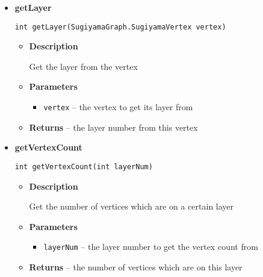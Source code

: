 {{{{{{{{{{{\begin{itemize}
{\begin{itemize}
{Assigns a vertex to a certain layer represented by a number.
}
\item{
{\bf  Parameters}
  \begin{itemize}
   \item{
\texttt{vertex} -- the vertex to assign to a layer}
   \item{
\texttt{layerNum} -- the layer number to assign a vertex to}
  \end{itemize}
}%
\end{itemize}
}%
\item{ 
{\bf  getLayer}\\
\begin{lstlisting}[frame=none]
int getLayer(SugiyamaGraph.SugiyamaVertex vertex)\end{lstlisting} %
\begin{itemize}
\item{
{\bf  Description}

Get the layer from the vertex
}
\item{
{\bf  Parameters}
  \begin{itemize}
   \item{
\texttt{vertex} -- the vertex to get its layer from}
  \end{itemize}
}%
\item{{\bf  Returns} -- 
the layer number from this vertex 
}%
\end{itemize}
}%
\item{ 
{\bf  getVertexCount}\\
\begin{lstlisting}[frame=none]
int getVertexCount(int layerNum)\end{lstlisting} %
\begin{itemize}
\item{
{\bf  Description}

Get the number of vertices which are on a certain layer
}
\item{
{\bf  Parameters}
  \begin{itemize}
   \item{
\texttt{layerNum} -- the layer number to get the vertex count from}
  \end{itemize}
}%
\item{{\bf  Returns} -- 
the number of vertices which are on this layer 
}%
\end{itemize}
}%
\end{itemize}
}
}
}}}}}}}}}
